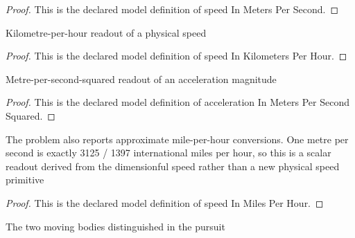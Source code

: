 \begin{proof}
  This is the declared model definition of speed In Meters Per Second.
\end{proof}
\begin{definition}
  \label{def:physics:phyx-mini-0794:phyxminiproblems-problemphyxmini0794-speedinkilometersperhour}
  Kilometre-per-hour readout of a physical speed
\end{definition}
\begin{proof}
  This is the declared model definition of speed In Kilometers Per Hour.
\end{proof}
\begin{definition}
  \label{def:physics:phyx-mini-0794:phyxminiproblems-problemphyxmini0794-accelerationinmeterspersecondsquared}
  Metre-per-second-squared readout of an acceleration magnitude
\end{definition}
\begin{proof}
  This is the declared model definition of acceleration In Meters Per Second Squared.
\end{proof}
\begin{definition}
  \label{def:physics:phyx-mini-0794:phyxminiproblems-problemphyxmini0794-speedinmilesperhour}
  The problem also reports approximate mile-per-hour conversions. One metre per second is exactly 3125 / 1397 international miles per hour, so this is a scalar readout derived from the dimensionful speed rather than a new physical speed primitive
\end{definition}
\begin{proof}
  This is the declared model definition of speed In Miles Per Hour.
\end{proof}
\begin{definition}
  \label{def:physics:phyx-mini-0794:phyxminiproblems-problemphyxmini0794-roaduser}
  The two moving bodies distinguished in the pursuit
\end{definition}
